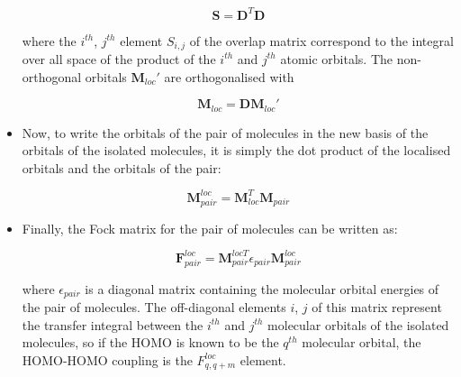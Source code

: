 \documentclass[a4paper,12pt]{article}
\begin{document}
\begin{itemize}
\begin{equation}
\textbf{S}=\textbf{D}^T\textbf{D}
\end{equation}

where the $i^{th}$, $j^{th}$ element $S_{i,j}$ of the overlap matrix correspond to the integral over all space of the product of the $i^{th}$ and $j^{th}$ atomic orbitals. The non-orthogonal orbitals $\textbf{M}_{loc}'$ are orthogonalised with 

\begin{equation}
\textbf{M}_{loc}=\textbf{D}\textbf{M}_{loc}'
\end{equation}

\item Now, to write the orbitals of the pair of molecules in the new basis of the orbitals of the isolated molecules, it is simply the dot product of the localised orbitals and the orbitals of the pair:

\begin{equation}
\textbf{M}_{pair}^{loc}=\textbf{M}_{loc}^{T} \textbf{M}_{pair}
\end{equation}

\item Finally, the Fock matrix for the pair of molecules can be written as:

\begin{equation}
\textbf{F}_{pair}^{loc}=\textbf{M}_{pair}^{loc T} \epsilon_{pair} \textbf{M}_{pair}^{loc}
\end{equation}

where $\epsilon_{pair}$ is a diagonal matrix containing the molecular orbital energies of the pair of molecules. The off-diagonal elements $i$, $j$ of this matrix represent the transfer integral between the $i^{th}$ and $j^{th}$ molecular orbitals of the isolated molecules, so if the HOMO is known to be the $q^{th}$ molecular orbital, the HOMO-HOMO coupling is the $F_{q, q+m}^{loc}$ element.    

\end{itemize}
\end{document}
